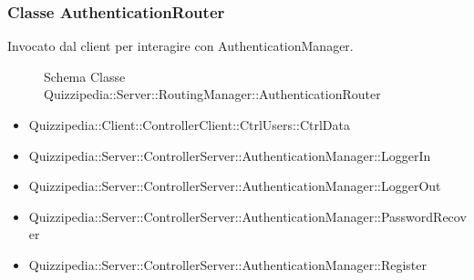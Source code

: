 \subsubsection{Classe AuthenticationRouter}
Invocato dal client per interagire con AuthenticationManager.
\begin{figure}[H]
\centering
\noindent{}
\caption[Schema Classe AuthenticationRouter]{Schema Classe Quizzipedia::Server::RoutingManager::AuthenticationRouter}
\end{figure}
\begin{itemize}
\item Quizzipedia::Client::ControllerClient::CtrlUsers::CtrlData
\end{itemize}
\begin{itemize}
\item Quizzipedia::Server::ControllerServer::AuthenticationManager::LoggerIn
\item Quizzipedia::Server::ControllerServer::AuthenticationManager::LoggerOut
\item Quizzipedia::Server::ControllerServer::AuthenticationManager::PasswordRecover
\item Quizzipedia::Server::ControllerServer::AuthenticationManager::Register
\end{itemize}
